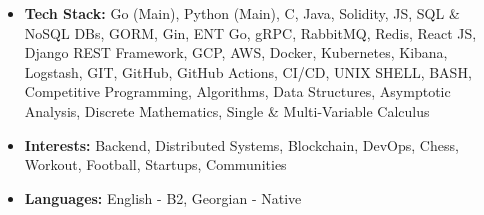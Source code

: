 \par
\begin{itemize}[label=$\bullet$]
    \item \textbf{Tech Stack:} Go (Main), Python (Main), C, Java, Solidity, JS, SQL \& NoSQL DBs, GORM, Gin, ENT Go, gRPC, RabbitMQ, Redis, React JS, Django REST Framework, GCP, AWS, Docker, Kubernetes, Kibana, Logstash, GIT, GitHub, GitHub Actions, CI/CD, UNIX SHELL, BASH, Competitive Programming, Algorithms, Data Structures, Asymptotic Analysis, Discrete Mathematics, Single \& Multi-Variable Calculus
    \item \textbf{Interests:} Backend, Distributed Systems, Blockchain, DevOps, Chess, Workout, Football, Startups, Communities
    \item \textbf{Languages:} English - B2, Georgian - Native
\end{itemize}
\par
